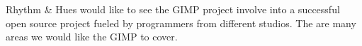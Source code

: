 
Rhythm \& Hues would like to see the GIMP project involve into a
successful open source project fueled by programmers from different
studios. The are many areas we would like the GIMP to cover.

